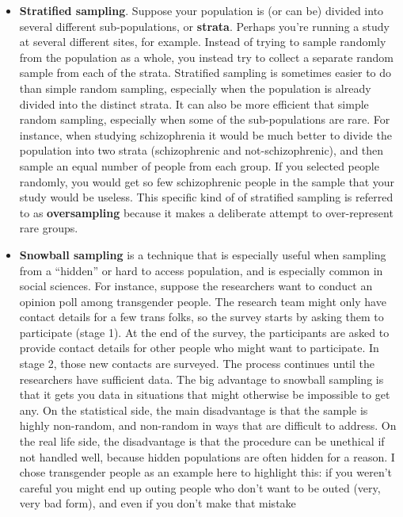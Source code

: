 \documentclass[
  letterpaper,
  DIV=11,
  numbers=noendperiod]{scrreprt}
\begin{document}
\begin{itemize}
\item
  \textbf{Stratified sampling}. Suppose your population is (or can be)
  divided into several different sub-populations, or \textbf{strata}.
  Perhaps you're running a study at several different sites, for
  example. Instead of trying to sample randomly from the population as a
  whole, you instead try to collect a separate random sample from each
  of the strata. Stratified sampling is sometimes easier to do than
  simple random sampling, especially when the population is already
  divided into the distinct strata. It can also be more efficient that
  simple random sampling, especially when some of the sub-populations
  are rare. For instance, when studying schizophrenia it would be much
  better to divide the population into two strata (schizophrenic and
  not-schizophrenic), and then sample an equal number of people from
  each group. If you selected people randomly, you would get so few
  schizophrenic people in the sample that your study would be useless.
  This specific kind of of stratified sampling is referred to as
  \textbf{oversampling} because it makes a deliberate attempt to
  over-represent rare groups.
\item
  \textbf{Snowball sampling} is a technique that is especially useful
  when sampling from a ``hidden'' or hard to access population, and is
  especially common in social sciences. For instance, suppose the
  researchers want to conduct an opinion poll among transgender people.
  The research team might only have contact details for a few trans
  folks, so the survey starts by asking them to participate (stage 1).
  At the end of the survey, the participants are asked to provide
  contact details for other people who might want to participate. In
  stage 2, those new contacts are surveyed. The process continues until
  the researchers have sufficient data. The big advantage to snowball
  sampling is that it gets you data in situations that might otherwise
  be impossible to get any. On the statistical side, the main
  disadvantage is that the sample is highly non-random, and non-random
  in ways that are difficult to address. On the real life side, the
  disadvantage is that the procedure can be unethical if not handled
  well, because hidden populations are often hidden for a reason. I
  chose transgender people as an example here to highlight this: if you
  weren't careful you might end up outing people who don't want to be
  outed (very, very bad form), and even if you don't make that mistake

\end{itemize}
\end{document}

